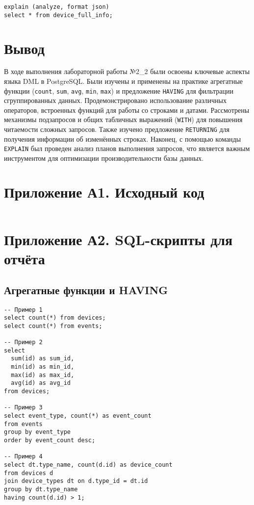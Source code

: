 \documentclass[oneside,a4paper,14pt]{extarticle}
\begin{document}
\begin{verbatim}
explain (analyze, format json) 
select * from device_full_info;
\end{verbatim}

\clearpage
\section*{Вывод}

В ходе выполнения лабораторной работы №2\_2 были освоены ключевые аспекты языка DML в PostgreSQL. Были изучены и применены на практике агрегатные функции (\texttt{count}, \texttt{sum}, \texttt{avg}, \texttt{min}, \texttt{max}) и предложение \texttt{HAVING} для фильтрации сгруппированных данных. Продемонстрировано использование различных операторов, встроенных функций для работы со строками и датами. Рассмотрены механизмы подзапросов и общих табличных выражений (\texttt{WITH}) для повышения читаемости сложных запросов. Также изучено предложение \texttt{RETURNING} для получения информации об изменённых строках. Наконец, с помощью команды \texttt{EXPLAIN} был проведен анализ планов выполнения запросов, что является важным инструментом для оптимизации производительности базы данных.

\newpage


\section*{Приложение А1. Исходный код}
\inputminted{Dockerfile}{../Containerfile}

\section*{Приложение А2. SQL-скрипты для отчёта}

\subsection*{Агрегатные функции и HAVING}
\begin{verbatim}
-- Пример 1
select count(*) from devices;
select count(*) from events;

-- Пример 2
select 
  sum(id) as sum_id,
  min(id) as min_id, 
  max(id) as max_id, 
  avg(id) as avg_id
from devices;

-- Пример 3
select event_type, count(*) as event_count
from events
group by event_type
order by event_count desc;

-- Пример 4
select dt.type_name, count(d.id) as device_count
from devices d
join device_types dt on d.type_id = dt.id
group by dt.type_name
having count(d.id) > 1;
\end{verbatim}
\end{document}
